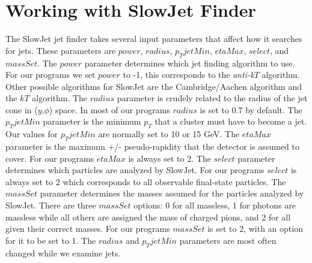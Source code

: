 \documentclass[11pt]{article}
\begin{document}
\section{Working with SlowJet Finder}
%
%
The SlowJet jet finder takes several input parameters that affect how it searches for jets. These parameters are $power$, $radius$, $p_TjetMin$, $etaMax$, $select$, and $massSet$. The $power$ parameter determines which jet finding algorithm to use. For our programs we set $power$ to -1, this corresponds to the {\it anti-k$T$} algorithm. Other possible algorithms for SlowJet are the Cambridge/Aachen algorithm and the $kT$ algorithm. The $radius$ parameter is crudely related to the radius of the jet cone in ($y$,$\phi$) space. In most of our programs $radius$ is set to 0.7 by default. The $p_TjetMin$ parameter is the minimum $p_T$ that a cluster must have to become a jet. Our values for $p_TjetMin$ are normally set to 10 or 15 GeV. The $etaMax$ parameter is the maximum +/- pseudo-rapidity that the detector is assumed to cover. For our programs $etaMax$ is always set to 2. The $select$ parameter determines which particles are analyzed by SlowJet. For our programs $select$ is always set to 2 which corresponds to all observable final-state particles. The $massSet$ parameter determines the masses assumed for the particles analyzed by SlowJet. There are three $massSet$ options: 0 for all massless, 1 for photons are massless while all others are assigned the mass of charged pions, and 2 for all given their correct masses. For our programs $massSet$ is set to 2, with an option for it to be set to 1. The $radius$ and $p_TjetMin$ parameters are most often changed while we examine jets.
\end{document}
